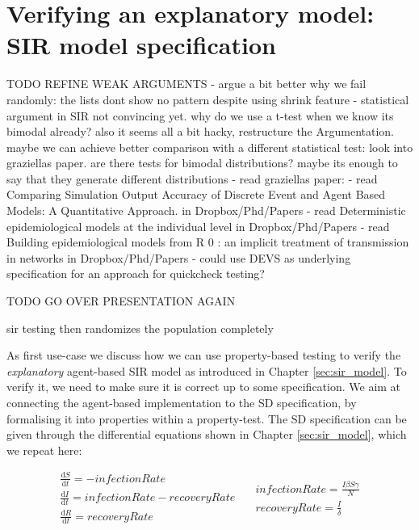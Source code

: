 \chapter{Verifying an explanatory model: SIR model specification}
\label{ch:prop_explanatory}

TODO REFINE WEAK ARGUMENTS
- argue a bit better why we fail randomly: the lists dont show no pattern despite using shrink feature
- statistical argument in SIR not convincing yet. why do we use a t-test when we know its bimodal already? also it seems all a bit hacky, restructure the Argumentation. maybe we can achieve better comparison with a different statistical test: look into graziellas paper. are there tests for bimodal distributions? maybe its enough to say that they generate different distributions
- read graziellas paper: \cite{figueredo_comparing_2014}
- read Comparing Simulation Output Accuracy of Discrete Event and Agent Based Models: A Quantitative Approach. in Dropbox/Phd/Papers
- read Deterministic epidemiological models at the individual level in Dropbox/Phd/Papers
- read Building epidemiological models from R 0 : an implicit treatment of transmission in networks in Dropbox/Phd/Papers
- could use DEVS as underlying specification for an approach for quickcheck testing?

TODO GO OVER PRESENTATION AGAIN

sir testing then randomizes the population completely

As first use-case we discuss how we can use property-based testing to verify the \textit{explanatory} agent-based SIR model as introduced in Chapter \ref{sec:sir_model}. To verify it, we need to make sure it is correct up to some specification. We aim at connecting the agent-based implementation to the SD specification, by formalising it into properties within a property-test. The SD specification can be given through the differential equations shown in Chapter \ref{sec:sir_model}, which we repeat here:

\begin{equation}
\begin{split}
\frac{\mathrm d S}{\mathrm d t} = -infectionRate \\
\frac{\mathrm d I}{\mathrm d t} = infectionRate - recoveryRate \\
\frac{\mathrm d R}{\mathrm d t} = recoveryRate 
\end{split}
\quad
\begin{split}
infectionRate = \frac{I \beta S \gamma}{N} \\
recoveryRate = \frac{I}{\delta} 
\end{split}
\end{equation}
\label{eq:sir_delta_rates}

